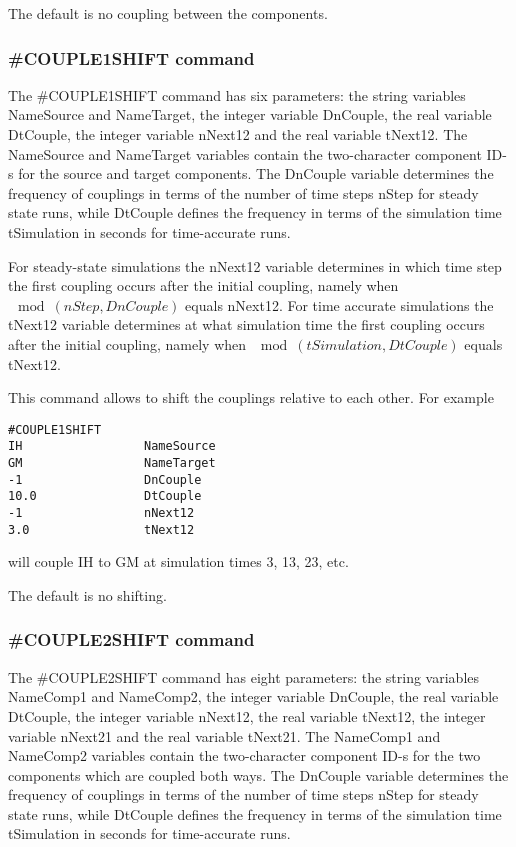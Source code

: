 The default is no coupling between the components.

\subsubsection{\#COUPLE1SHIFT command}

The \#COUPLE1SHIFT command has six parameters: the string variables
NameSource and NameTarget, the integer variable DnCouple,
the real variable DtCouple, the integer variable nNext12 and
the real variable tNext12. The NameSource and NameTarget 
variables contain the two-character component ID-s for the source
and target components. The DnCouple variable determines the frequency
of couplings in terms of the number of time steps nStep for steady state
runs, while DtCouple defines the frequency in terms of the simulation
time tSimulation in seconds for time-accurate runs. 

For steady-state simulations the nNext12 variable determines in which time 
step the first coupling occurs after the initial coupling, namely 
when $\mod(nStep,DnCouple)$ equals nNext12. For time accurate
simulations the tNext12 variable determines at what simulation
time the first coupling occurs after the initial coupling, namely
when $\mod(tSimulation,DtCouple)$ equals tNext12.

This command allows to shift the couplings relative to each other.
For example
\begin{verbatim}
#COUPLE1SHIFT
IH                 NameSource
GM                 NameTarget
-1                 DnCouple
10.0               DtCouple
-1                 nNext12
3.0                tNext12
\end{verbatim}
will couple IH to GM at simulation times 3, 13, 23, etc.

The default is no shifting.

\subsubsection{\#COUPLE2SHIFT command}

The \#COUPLE2SHIFT command has eight parameters: the string variables
NameComp1 and NameComp2, the integer variable DnCouple,
the real variable DtCouple, the integer variable nNext12,
the real variable tNext12, the integer variable nNext21 and
the real variable tNext21. The NameComp1 and NameComp2 
variables contain the two-character component ID-s for the two
components which are coupled both ways.
The DnCouple variable determines the frequency
of couplings in terms of the number of time steps nStep for steady state
runs, while DtCouple defines the frequency in terms of the simulation
time tSimulation in seconds for time-accurate runs. 

